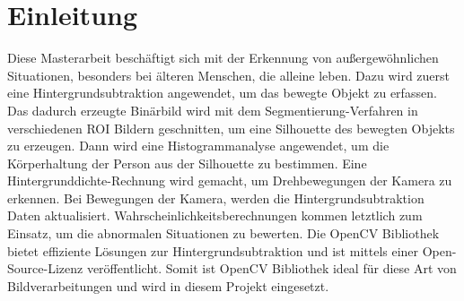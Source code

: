\chapter{Einleitung}
Diese Masterarbeit beschäftigt sich mit der Erkennung von außergewöhnlichen Situationen, besonders bei älteren Menschen, die alleine leben. Dazu wird zuerst eine Hintergrundsubtraktion angewendet, um das bewegte Objekt zu erfassen. Das dadurch erzeugte Binärbild wird mit dem Segmentierung-Verfahren in verschiedenen \acs{ROI} Bildern geschnitten, um eine Silhouette des bewegten Objekts zu erzeugen. Dann wird eine Histogrammanalyse angewendet, um die Körperhaltung der Person aus der Silhouette zu bestimmen. Eine Hintergrunddichte-Rechnung wird gemacht, um Drehbewegungen der Kamera zu erkennen. Bei Bewegungen der Kamera, werden die Hintergrundsubtraktion Daten aktualisiert. Wahrscheinlichkeitsberechnungen kommen letztlich zum Einsatz, um die abnormalen Situationen zu bewerten. Die OpenCV Bibliothek bietet effiziente Lösungen zur Hintergrundsubtraktion und ist mittels einer Open-Source-Lizenz veröffentlicht. Somit ist OpenCV Bibliothek ideal für diese Art von Bildverarbeitungen und wird in diesem Projekt eingesetzt.

